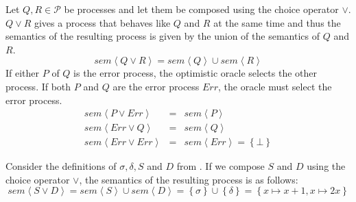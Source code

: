 \begin{definition}
\label{def:sem_choice}
Let $Q, R \in \mathcal{P}$ be processes and let them be composed using the choice operator $\vee$. $Q \vee R$ gives a process that behaves like $Q$ and $R$ at the same time and thus the semantics of the resulting process is given by the union of the semantics of $Q$ and $R$.
  \begin{equation}
    \label{eqn:sem_choice}
    sem \left\langle Q \vee R \right\rangle = sem \left\langle Q \right\rangle \cup sem \left\langle R \right\rangle
  \end{equation}
If either $P$ of $Q$ is the error process, the optimistic oracle selects the other process. If both $P$ and $Q$ are the error process $Err$, the oracle must select the error process.
  \begin{eqnarray}
    sem \left\langle P \vee Err \right\rangle & = & sem \left\langle P \right\rangle \\
    sem \left\langle Err \vee Q \right\rangle & = & sem \left\langle Q \right\rangle \\
    sem \left\langle Err \vee Err \right\rangle & = & sem \left\langle Err \right\rangle = \left\{ \bot \right\}
  \end{eqnarray}
  \hfill\qedsymbol
\end{definition}

\begin{example}
\label{exp:sem_chice}
Consider the definitions of $\sigma, \delta, S$ and $D$ from . If we compose $S$ and $D$ using the choice operator $\vee$, the semantics of the resulting process is as follows:
  \begin{equation}
    sem \left\langle S \vee D \right\rangle = sem \left\langle S \right\rangle \cup sem \left\langle D \right\rangle = \left\{ \sigma \right\} \cup \left\{ \delta \right\} = \left\{ x \mapsto x+1, x \mapsto 2x \right\}
  \end{equation}
  \hfill\qedsymbol
\end{example}


